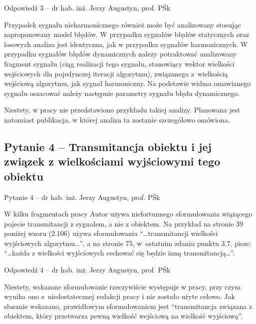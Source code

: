 \documentclass[12pt, polish, aspectratio = 169]{slides}
\begin{document}
\begin{frame}[allowframebreaks]{Odpowiedź 3 -- dr hab. inż. Jerzy Augustyn, prof. PŚk}\small
\begin{justify}
Przypadek sygnału nieharmonicznego również może być analizowany stosując zaproponowany model błędów. W przypadku sygnałów błędów statycznych oraz losowych analiza jest identyczna, jak w przypadku sygnałów harmonicznych. W przypadku sygnałów błędów dynamicznych należy potraktować analizowany fragment sygnału (ciąg realizacji tego sygnału, stanowiący wektor wielkości wejściowych dla pojedynczej iteracji algorytmu), związanego z wielkością wejściową algorytmu, jak sygnał harmoniczny. Na podstawie widma omawianego sygnału oszacować należy następnie parametry sygnału błędu dynamicznego.

Niestety, w pracy nie przedstawiono przykładu takiej analizy. Planowana jest natomiast publikacja, w której analiza ta zostanie szczegółowo omówiona.
\end{justify}
\end{frame}

\subsection{Pytanie 4 -- Transmitancja obiektu i jej związek z wielkościami wyjściowymi tego obiektu}

\begin{frame}{Pytanie 4 -- dr hab. inż. Jerzy Augustyn, prof. PŚk}\large
\begin{justify}
W kilku fragmentach pracy Autor używa niefortunnego sformułowania wiążącego pojecie transmitancji z sygnałem, a nie z obiektem. Na przykład na stronie 39 poniżej wzoru (2.106) używa sformułowania \enquote{\dots transmitancji wielkości wyjściowych algorytmu\dots}, a na stronie 75, w ostatnim zdaniu punktu 3.7, pisze: \enquote{\dots każda z wielkości wyjściowych cechować się będzie inną transmitancją\dots}.
\end{justify}
\end{frame}

\begin{frame}[allowframebreaks]{Odpowiedź 4 -- dr hab. inż. Jerzy Augustyn, prof. PŚk}\small
\begin{justify}
Niestety, wskazane sformułowanie rzeczywiście występuje w pracy, przy czym wynika ono z niedostatecznej redakcji pracy i nie zostało użyte celowo. Jak słusznie wskazano, prawidłowym sformułowaniem jest \enquote{transmitancja związana z obiektem, który przetwarza pewną wielkość wejściową na wielkość wyjściową}.
\end{justify}
\end{frame}
\end{document}
